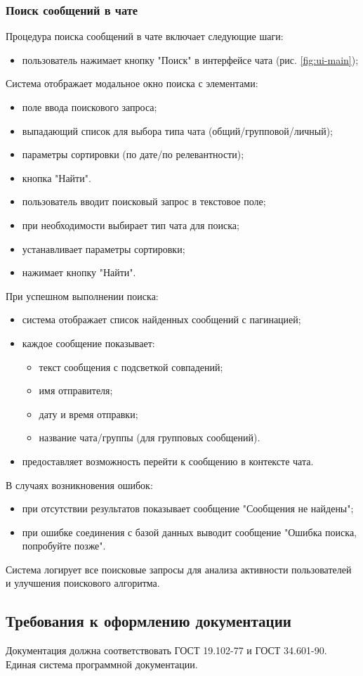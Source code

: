 \subsubsection{Поиск сообщений в чате}
Процедура поиска сообщений в чате включает следующие шаги:

\begin{itemize}
	\item пользователь нажимает кнопку "Поиск" в интерфейсе чата (рис. \ref{fig:ui-main});
\end{itemize}

Система отображает модальное окно поиска с элементами:
\begin{itemize}
	\item поле ввода поискового запроса;
	\item выпадающий список для выбора типа чата (общий/групповой/личный);
	\item параметры сортировки (по дате/по релевантности);
	\item кнопка "Найти".
\end{itemize}

\begin{itemize}
	\item пользователь вводит поисковый запрос в текстовое поле;
	\item при необходимости выбирает тип чата для поиска;
	\item устанавливает параметры сортировки;
	\item нажимает кнопку "Найти".
\end{itemize}

При успешном выполнении поиска:
\begin{itemize}
	\item система отображает список найденных сообщений с пагинацией;
	\item каждое сообщение показывает:
	\begin{itemize}
		\item текст сообщения с подсветкой совпадений;
		\item имя отправителя;
		\item дату и время отправки;
		\item название чата/группы (для групповых сообщений).
	\end{itemize}
	\item предоставляет возможность перейти к сообщению в контексте чата.
\end{itemize}

В случаях возникновения ошибок:
\begin{itemize}
	\item при отсутствии результатов показывает сообщение "Сообщения не найдены";
	\item при ошибке соединения с базой данных выводит сообщение "Ошибка поиска, попробуйте позже".
\end{itemize}

Система логирует все поисковые запросы для анализа активности пользователей и улучшения поискового алгоритма.

\subsection{Требования к оформлению документации}

Документация должна соответствовать ГОСТ 19.102-77 и ГОСТ 34.601-90. Единая система программной документации.